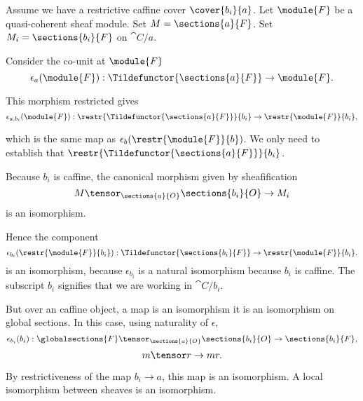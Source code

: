 Assume we have a restrictive caffine cover $\cover{b_i}{a}$. 
Let $\module{F}$ be a quasi-coherent sheaf module. 
Set $M = \sections{a}{F}$.
Set $M_i = \sections{b_i}{F}$ on $\cat{C}/a$.

Consider the co-unit at $\module{F}$
\[\epsilon_a(\module{F}): \Tildefunctor{\sections{a}{F}} \rightarrow \module{F}.\]

This morphism restricted gives
\[\epsilon_{a,b_i}(\module{F}): \restr{\Tildefunctor{\sections{a}{F}}}{b_i} \rightarrow \restr{\module{F}}{b_i},\]

which is the same map as $\epsilon_{b}(\restr{\module{F}}{b})$.
We only need to establish that $\restr{\Tildefunctor{\sections{a}{F}}}{b_i}$.

Because $b_i$ is caffine, the canonical morphism given by sheafification
\[ M \tensor_{\sections{a}{O}} \sections{b_i}{O} \rightarrow  M_i\] is an isomorphism.

Hence the component 
\[\epsilon_{b_i}(\restr{\module{F}}{b_i}): \Tildefunctor{\sections{b_i}{F}} \rightarrow \restr{\module{F}}{b_i}.\]
is an isomorphism, because $\epsilon_{b_i}$ is a natural isomorphism because $b_i$ is caffine.
The subscript ${b_i}$ signifies that we are working in $\cat{C}/b_i$.

But over an caffine object, a map is an isomorphism \iff it is an isomorphism on global sections. 
In this case, using naturality of $\epsilon$,
\[\epsilon_{b_i}(b_i): \globalsections{F} \tensor_{\sections{a}{O}} \sections{b_i}{O} \rightarrow \sections{b_i}{F},\]
\[ m \tensor r \rightarrow mr.\]

By restrictiveness of the map $b_i\rightarrow a$, this map is an isomorphism. A local isomorphism between sheaves is an isomorphism.




